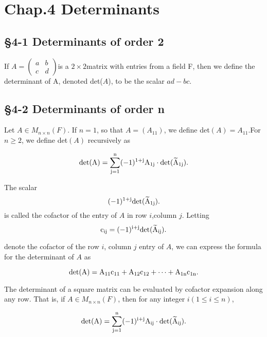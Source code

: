 
\linespread{1.6}

	\section*{Chap.4 Determinants}
		\subsection*{\S 4-1 Determinants of order 2}
		
		\begin{defn}
			If $A = \left( \begin{matrix}a & b\\c & d
			\end{matrix} \right)$is a $2\times 2$matrix with entries from a field F, then we define the determinant of A, denoted det($A$), to be the scalar $ad - bc$.
		\end{defn}
		
		\begin{example}
		\end{example}
		
		\subsection*{\S 4-2 Determinants of order n}
		
		\begin{defn}
			Let $A \in M_{n\times n}(F)$. If $n=1$, so that $A = (A_{11})$, we define det$(A)=A_{11}$.For $n \geq 2$, we define det$(A)$ recursively as
		
			\[\rm	 det(A)=\sum_{j=1}^{n}(-1)^{1+j} A_{1j} \cdot  det(\widetilde{A}_{1j} )    .\]
		
		The scalar 
		\[\rm	 (-1)^{1+j}   det(\widetilde{A}_{1j} )    .\]
		is called the cofactor of the entry of $A$ in row $i$,column $j$.
		Letting 
		\[\rm	 c_{ij} = (-1)^{i+j}det(\widetilde{A}_{ij})    .\]
		
		denote the cofactor of the row $i$, column $j$ entry of $A$, we can express the formula for the determinant of $A$ as 
		
		\[\rm	 det(A)=A_{11}c_{11} + A_{12}c_{12} + \cdots + A_{1n}c_{1n}    .\]
		\end{defn}
		
				
		\begin{thm*}
		$ $\\ The determinant of a square matrix can be evaluated by
cofactor expansion along any row. That is, if $A \in M_{n\times n}(F)$, then for any integer $i(1\leq i\leq n)$,

			\[\rm	 det(A)=\sum_{j=1}^{n}(-1)^{i+j} A_{ij} \cdot  det(\widetilde{A}_{ij} )    .\]
		\end{thm*}
		
